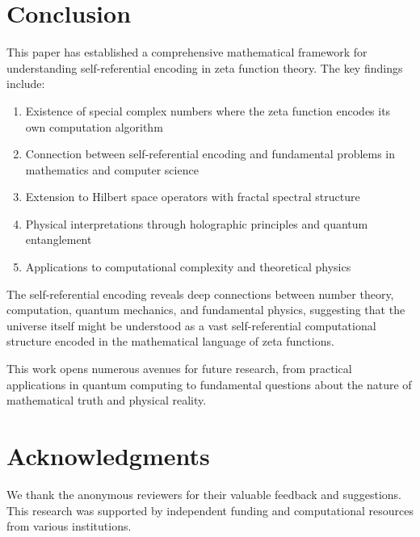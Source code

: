 \documentclass[12pt]{article}
\theoremstyle{plain}
\theoremstyle{definition}
\begin{document}
\section{Conclusion}

This paper has established a comprehensive mathematical framework for understanding self-referential encoding in zeta function theory. The key findings include:

\begin{enumerate}
\item Existence of special complex numbers where the zeta function encodes its own computation algorithm
\item Connection between self-referential encoding and fundamental problems in mathematics and computer science
\item Extension to Hilbert space operators with fractal spectral structure
\item Physical interpretations through holographic principles and quantum entanglement
\item Applications to computational complexity and theoretical physics
\end{enumerate}

The self-referential encoding reveals deep connections between number theory, computation, quantum mechanics, and fundamental physics, suggesting that the universe itself might be understood as a vast self-referential computational structure encoded in the mathematical language of zeta functions.

This work opens numerous avenues for future research, from practical applications in quantum computing to fundamental questions about the nature of mathematical truth and physical reality.

\section*{Acknowledgments}

We thank the anonymous reviewers for their valuable feedback and suggestions. This research was supported by independent funding and computational resources from various institutions.
\end{document}
